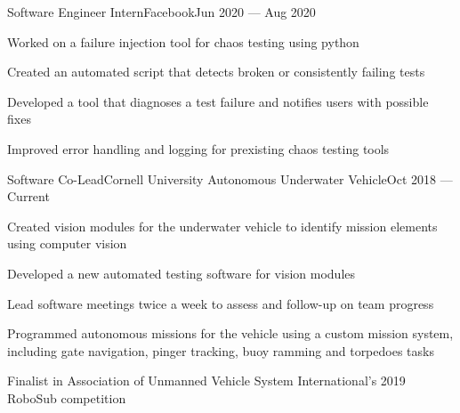 \documentclass{resume}
\begin{document}
\begin{experience}
    \begin{entry}{Software Engineer Intern}{Facebook}{Jun 2020 --- Aug 2020}
        \begin{description}
            \item Worked on a failure injection tool for chaos testing using
                python
            \item Created an automated script that detects broken or consistently
                failing tests
            \item Developed a tool that diagnoses a test failure and notifies
                users with possible fixes
            \item Improved error handling and logging for prexisting chaos
                testing tools
        \end{description}
    \end{entry}

    \begin{entry}{Software Co-Lead}{Cornell University Autonomous Underwater
        Vehicle}{Oct 2018 --- Current}
        \begin{description}
            \item Created vision modules for the underwater vehicle to identify
                mission elements using computer vision
            \item Developed a new automated testing software for vision modules
            \item Lead software meetings twice a week to assess and follow-up on
                team progress
            \item Programmed autonomous missions for the vehicle using a custom
                mission system, including gate navigation, pinger tracking, buoy
                ramming and torpedoes tasks
            \item Finalist in Association of Unmanned Vehicle System
                International's 2019 RoboSub competition
        \end{description}
    \end{entry}



\end{experience}
\end{document}

